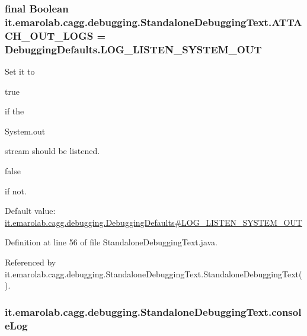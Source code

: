 \hypertarget{classit_1_1emarolab_1_1cagg_1_1debugging_1_1StandaloneDebuggingText_a096b28d2f3e1c71e7f3d039559ea91a3}{
\subsubsection[{A\-T\-T\-A\-C\-H\-\_\-\-O\-U\-T\-\_\-\-L\-O\-G\-S}]{\setlength{\rightskip}{0pt plus 5cm}final Boolean it.\-emarolab.\-cagg.\-debugging.\-Standalone\-Debugging\-Text.\-A\-T\-T\-A\-C\-H\-\_\-\-O\-U\-T\-\_\-\-L\-O\-G\-S = {\bf Debugging\-Defaults.\-L\-O\-G\-\_\-\-L\-I\-S\-T\-E\-N\-\_\-\-S\-Y\-S\-T\-E\-M\-\_\-\-O\-U\-T}\hspace{0.3cm}{\ttfamily [static]}}}\label{classit_1_1emarolab_1_1cagg_1_1debugging_1_1StandaloneDebuggingText_a096b28d2f3e1c71e7f3d039559ea91a3}
Set it to
\begin{DoxyCode}
\textcolor{keyword}{true} 
\end{DoxyCode}
 if the
\begin{DoxyCode}
System.out 
\end{DoxyCode}
 stream should be listened.
\begin{DoxyCode}
\textcolor{keyword}{false} 
\end{DoxyCode}
 if not. \par
 Default value\-: \hyperlink{classit_1_1emarolab_1_1cagg_1_1debugging_1_1DebuggingDefaults_a2d4710f38eb7e92c5b733f49baefd243}{it.\-emarolab.\-cagg.\-debugging.\-Debugging\-Defaults\#\-L\-O\-G\-\_\-\-L\-I\-S\-T\-E\-N\-\_\-\-S\-Y\-S\-T\-E\-M\-\_\-\-O\-U\-T} 

Definition at line 56 of file Standalone\-Debugging\-Text.\-java.



Referenced by it.\-emarolab.\-cagg.\-debugging.\-Standalone\-Debugging\-Text.\-Standalone\-Debugging\-Text().

\hypertarget{classit_1_1emarolab_1_1cagg_1_1debugging_1_1StandaloneDebuggingText_a10b29a352e383e5d6c592a74649c25c9}{
\subsubsection[{console\-Log}]{ it.\-emarolab.\-cagg.\-debugging.\-Standalone\-Debugging\-Text.\-console\-Log\hspace{0.3cm}{\ttfamily [private]}}}\label{classit_1_1emarolab_1_1cagg_1_1debugging_1_1StandaloneDebuggingText_a10b29a352e383e5d6c592a74649c25c9}


